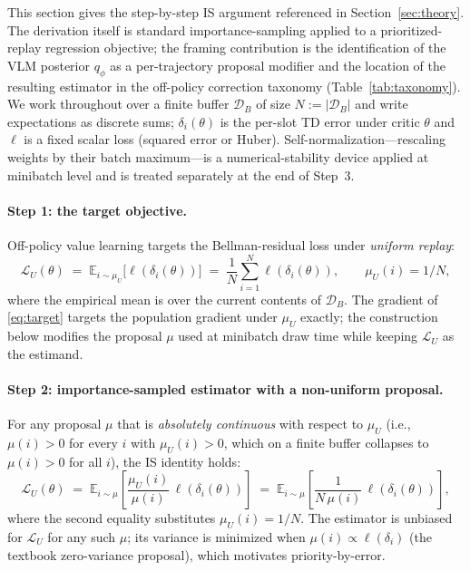This section gives the step-by-step IS argument referenced in
Section~\ref{sec:theory}. The derivation itself is standard
importance-sampling applied to a prioritized-replay regression
objective; the framing contribution is the identification of the
VLM posterior $q_\phi$ as a per-trajectory proposal modifier and the
location of the resulting estimator in the off-policy correction
taxonomy (Table~\ref{tab:taxonomy}). We work throughout over a finite
buffer $\mathcal{D}_B$ of size $N\!:=\!|\mathcal{D}_B|$ and write
expectations as discrete sums; $\delta_i(\theta)$ is the per-slot TD error
under critic $\theta$ and $\ell$ is a fixed scalar loss (squared error
or Huber). Self-normalization---rescaling weights by their batch
maximum---is a numerical-stability device applied at minibatch level and
is treated separately at the end of Step~3.

\paragraph{Step 1: the target objective.}
Off-policy value learning targets the Bellman-residual loss under
\emph{uniform replay}:
\begin{equation}
\mathcal{L}_U(\theta) \;=\; \mathbb{E}_{i\sim\mu_U}\bigl[\ell(\delta_i(\theta))\bigr]
\;=\; \frac{1}{N}\sum_{i=1}^{N} \ell(\delta_i(\theta)),
\qquad \mu_U(i)=1/N,
\label{eq:target}
\end{equation}
where the empirical mean is over the current contents of $\mathcal{D}_B$.
The gradient of \eqref{eq:target} targets the population gradient under
$\mu_U$ exactly; the construction below modifies the proposal $\mu$ used
at minibatch draw time while keeping $\mathcal{L}_U$ as the estimand.

\paragraph{Step 2: importance-sampled estimator with a non-uniform proposal.}
For any proposal $\mu$ that is \emph{absolutely continuous} with respect
to $\mu_U$ (i.e., $\mu(i)>0$ for every $i$ with $\mu_U(i)>0$, which on a
finite buffer collapses to $\mu(i)>0$ for all $i$), the IS identity holds:
\begin{equation}
\mathcal{L}_U(\theta) \;=\; \mathbb{E}_{i\sim\mu}\!\left[\frac{\mu_U(i)}{\mu(i)}\,
\ell(\delta_i(\theta))\right]
\;=\; \mathbb{E}_{i\sim\mu}\!\left[\frac{1}{N\,\mu(i)}\,\ell(\delta_i(\theta))\right],
\label{eq:is-identity}
\end{equation}
where the second equality substitutes $\mu_U(i)=1/N$.
The estimator is unbiased for $\mathcal{L}_U$ for any such $\mu$;
its variance is minimized when $\mu(i)\propto\ell(\delta_i)$
(the textbook zero-variance proposal), which motivates priority-by-error.

